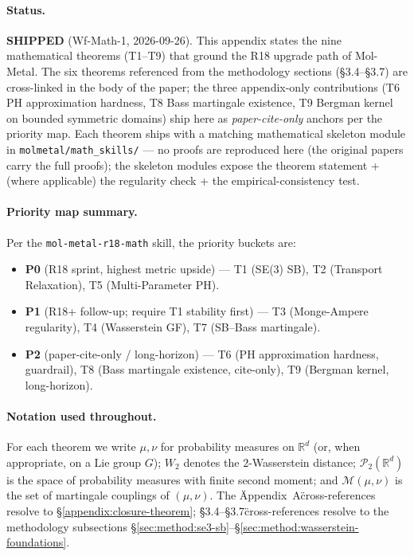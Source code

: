 \paragraph{Status.}
\textbf{SHIPPED} (Wf-Math-1, 2026-09-26).  This appendix states the
nine mathematical theorems (T1--T9) that ground the R18 upgrade path
of Mol-Metal.  The six theorems referenced from the methodology
sections (§3.4--§3.7) are cross-linked in the body of the paper; the
three appendix-only contributions (T6 PH approximation hardness,
T8 Bass martingale existence, T9 Bergman kernel on bounded symmetric
domains) ship here as \emph{paper-cite-only} anchors per the priority
map.  Each theorem ships with a matching mathematical skeleton module
in \texttt{molmetal/math\_skills/} --- no proofs are reproduced here
(the original papers carry the full proofs); the skeleton modules
expose the theorem statement + (where applicable) the regularity
check + the empirical-consistency test.

\paragraph{Priority map summary.}
Per the \texttt{mol-metal-r18-math} skill, the priority buckets are:
\begin{itemize}
  \item \textbf{P0} (R18 sprint, highest metric upside) --- T1
    (SE(3) SB), T2 (Transport Relaxation), T5 (Multi-Parameter PH).
  \item \textbf{P1} (R18+ follow-up; require T1 stability first) ---
    T3 (Monge-Ampere regularity), T4 (Wasserstein GF),
    T7 (SB--Bass martingale).
  \item \textbf{P2} (paper-cite-only / long-horizon) --- T6
    (PH approximation hardness, guardrail), T8 (Bass martingale
    existence, cite-only), T9 (Bergman kernel, long-horizon).
\end{itemize}

\paragraph{Notation used throughout.}
For each theorem we write $\mu, \nu$ for probability measures on
$\mathbb{R}^d$ (or, when appropriate, on a Lie group $G$); $W_2$
denotes the $2$-Wasserstein distance; $\mathcal{P}_2(\mathbb{R}^d)$
is the space of probability measures with finite second moment; and
$\mathcal{M}(\mu, \nu)$ is the set of martingale couplings of
$(\mu, \nu)$.  The \"Appendix~A\" cross-references resolve to
\S\ref{appendix:closure-theorem}; \"§3.4--§3.7\" cross-references
resolve to the methodology subsections
\S\ref{sec:method:se3-sb}--\S\ref{sec:method:wasserstein-foundations}.


